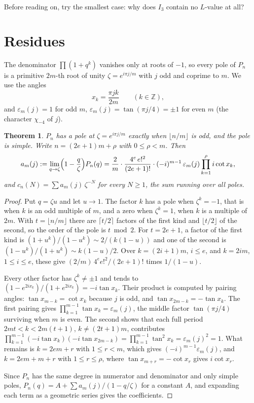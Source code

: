 \documentclass[11pt]{article}
\newtheorem{theorem}{Theorem}
\begin{document}
Before reading on, try the smallest case: why does $I_3$ contain no $L$-value at all?

\section{Residues}

The denominator $\prod(1+q^k)$ vanishes only at roots of $-1$, so every pole of $P_n$ is a primitive $2m$-th root
of unity $\zeta=e^{i\pi j/m}$ with $j$ odd and coprime to $m$. We use the angles
\[
x_k=\frac{\pi jk}{2m}\qquad(k\in\mathbb{Z}),
\]
and $\varepsilon_m(j)=1$ for odd $m$, $\varepsilon_m(j)=\tan(\pi j/4)=\pm1$ for even $m$ (the character
$\chi_{-4}$ of $j$).

\begin{theorem}\label{thm:res}
$P_n$ has a pole at $\zeta=e^{i\pi j/m}$ exactly when $\lfloor n/m\rfloor$ is odd, and the pole is simple. Write
$n=(2e+1)m+\rho$ with $0\le\rho<m$. Then
\[
a_m(j):=\lim_{q\to\zeta}\Bigl(1-\frac q\zeta\Bigr)P_n(q)
=\frac2m\cdot\frac{4^e\,e!^2}{(2e+1)!}\cdot(-i)^{m-1}\,\varepsilon_m(j)\prod_{k=1}^{\rho}i\cot x_k ,
\]
and $c_n(N)=\sum a_m(j)\,\zeta^{-N}$ for every $N\ge1$, the sum running over all poles.
\end{theorem}

\begin{proof}
Put $q=\zeta u$ and let $u\to1$. The factor $k$ has a pole when $\zeta^k=-1$, that is when $k$ is an odd multiple of
$m$, and a zero when $\zeta^k=1$, when $k$ is a multiple of $2m$. With $t=\lfloor n/m\rfloor$ there are $\lceil t/2\rceil$
factors of the first kind and $\lfloor t/2\rfloor$ of the second, so the order of the pole is $t\bmod2$. For $t=2e+1$,
a factor of the first kind is $(1+u^k)/(1-u^k)\sim 2/(k(1-u))$ and one of the second is
$(1-u^k)/(1+u^k)\sim k(1-u)/2$. Over $k=(2i+1)m$, $i\le e$, and $k=2im$, $1\le i\le e$, these give
$(2/m)\,4^e e!^2/(2e+1)!$ times $1/(1-u)$.

Every other factor has $\zeta^k\ne\pm1$ and tends to $(1-e^{2ix_k})/(1+e^{2ix_k})=-i\tan x_k$. Their product is
computed by pairing angles: $\tan x_{m-k}=\cot x_k$ because $j$ is odd, and $\tan x_{2m-k}=-\tan x_k$. The first
pairing gives $\prod_{k=1}^{m-1}\tan x_k=\varepsilon_m(j)$, the middle factor $\tan(\pi j/4)$ surviving when $m$ is
even. The second shows that each full period $2mt<k<2m(t+1)$, $k\neq(2t+1)m$, contributes
$\prod_{k=1}^{m-1}(-i\tan x_k)(-i\tan x_{2m-k})=\prod_{k=1}^{m-1}\tan^2x_k=\varepsilon_m(j)^2=1$. What remains is $k=2em+r$ with $1\le r<m$, which
gives $(-i)^{m-1}\varepsilon_m(j)$, and $k=2em+m+r$ with $1\le r\le\rho$, where $\tan x_{m+r}=-\cot x_r$ gives
$i\cot x_r$.

Since $P_n$ has the same degree in numerator and denominator and only simple poles, $P_n(q)=A+\sum a_m(j)/(1-q/\zeta)$
for a constant $A$, and expanding each term as a geometric series gives the coefficients.
\end{proof}
\end{document}
